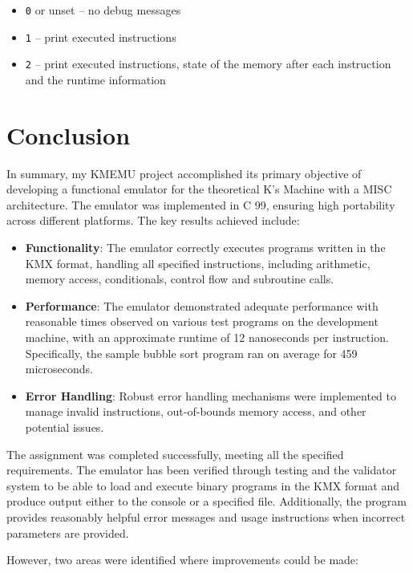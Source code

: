 \documentclass[10pt,a4paper,final]{article}
\newcommand{\code}[1]{\texttt{#1}}
\begin{document}
\begin{itemize}
    \item \code{0} or unset -- no debug messages
    \item \code{1} -- print executed instructions
    \item \code{2} -- print executed instructions, state of the memory after each
        instruction and the runtime information
\end{itemize}

\section{Conclusion}
\label{sec:conclusion}

In summary, my KMEMU project accomplished its primary objective of developing a
functional emulator for the theoretical K's Machine with a MISC architecture.
The emulator was implemented in C 99, ensuring high portability across different
platforms. The key results achieved include:

\begin{itemize}
    \item \textbf{Functionality}: The emulator correctly executes programs
        written in the KMX format, handling all specified instructions,
        including arithmetic, memory access, conditionals, control flow and
        subroutine calls.
    \item \textbf{Performance}: The emulator demonstrated adequate performance
        with reasonable times observed on various test programs on the
        development machine, with an approximate runtime of 12 nanoseconds per
        instruction. Specifically, the sample bubble sort program ran on average
        for 459 microseconds.
    \item \textbf{Error Handling}: Robust error handling mechanisms were
        implemented to manage invalid instructions, out-of-bounds memory access,
        and other potential issues.
\end{itemize}

The assignment was completed successfully, meeting all the specified
requirements. The emulator has been verified through testing and the validator
system to be able to load and execute binary programs in the KMX format and
produce output either to the console or a specified file. Additionally, the
program provides reasonably helpful error messages and usage instructions when
incorrect parameters are provided.

However, two areas were identified where improvements could be made:
\end{document}
